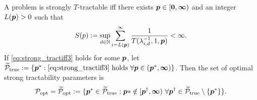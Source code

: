 \documentclass[11pt,a4paper]{article}
\begin{document}
\begin{theorem}\label{thm_main_strong_tract2}
A problem is strongly $T$-tractable iff there exists $\boldsymbol{p} \in [\boldsymbol{0}, \boldsymbol{\infty})$ and an integer $L(\boldsymbol{p}) > 0$ such that
\begin{equation} \label{eq:strong_tractiff3}
     S(p):=\sup_{d \in \mathbb{N}} \sum_{i = L(\boldsymbol{p})}^\infty \frac{1}{T(\lambda_{i,d}^{-1},1,\boldsymbol{p})} < \infty.
\end{equation}
If \eqref{eq:strong_tractiff3} holds for some $\boldsymbol{p}$, let  $\widetilde{\mathcal{P}}_{\textup{true}} : = \{\boldsymbol{p}^* : \eqref{eq:strong_tractiff3} \text{ holds }\forall \boldsymbol{p} \in (\boldsymbol{p}^*,\boldsymbol{\infty})\}$.  Then the set of optimal strong tractability parameters is
\[
	\mathcal{P}_{\textup{opt}} = \widetilde{\mathcal{P}}_{\textup{opt}} :=
	\{\boldsymbol{p}^* \in \widetilde{\mathcal{P}}_{\textup{true}} :  \boldsymbol{p}* \notin [\boldsymbol{p}^\dagger,\boldsymbol{\infty}) \ \forall \boldsymbol{p}^\dagger \in  \widetilde{\mathcal{P}}_{\textup{true}} \setminus \{\boldsymbol{p}^*\} \}.
\]
\end{theorem}
\end{document}
